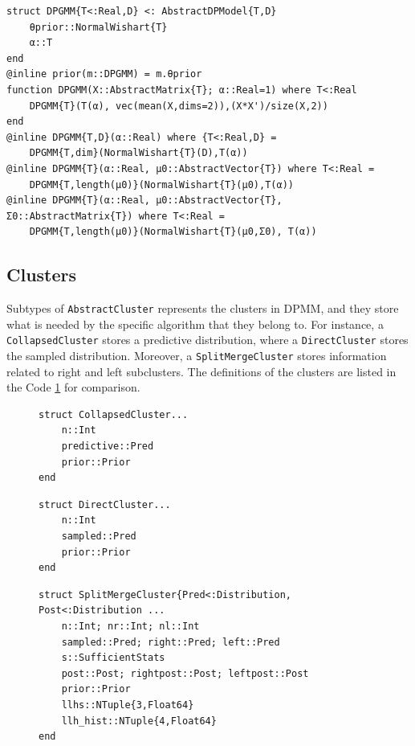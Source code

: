 \documentclass[12pt, a4paper]{article}
\newenvironment{code}{\captionsetup{type=listing}}{}
\begin{document}
\begin{code}
\begin{verbatim}
struct DPGMM{T<:Real,D} <: AbstractDPModel{T,D}
    θprior::NormalWishart{T}
    α::T
end
@inline prior(m::DPGMM) = m.θprior
function DPGMM(X::AbstractMatrix{T}; α::Real=1) where T<:Real
    DPGMM{T}(T(α), vec(mean(X,dims=2)),(X*X')/size(X,2))
end
@inline DPGMM{T,D}(α::Real) where {T<:Real,D} =
    DPGMM{T,dim}(NormalWishart{T}(D),T(α))
@inline DPGMM{T}(α::Real, μ0::AbstractVector{T}) where T<:Real =
    DPGMM{T,length(μ0)}(NormalWishart{T}(μ0),T(α))
@inline DPGMM{T}(α::Real, μ0::AbstractVector{T}, Σ0::AbstractMatrix{T}) where T<:Real =
    DPGMM{T,length(μ0)}(NormalWishart{T}(μ0,Σ0), T(α))
\end{verbatim}
\label{code:modelsdpgmm}
\end{code}



\subsection{Clusters}
Subtypes of \texttt{AbstractCluster} represents the clusters in DPMM, and they store what is needed by the specific algorithm that they belong to. For instance, a \texttt{CollapsedCluster} stores a predictive distribution, where a \texttt{DirectCluster} stores the sampled distribution. Moreover, a \texttt{SplitMergeCluster} stores information related to right and left subclusters. The definitions of the clusters are listed in the Code \ref{lst:representation_examples} for comparison.

\begin{figure}[h]
\begin{minipage}[t]{.4\textwidth}
\centering
\begin{verbatim}
struct CollapsedCluster...
    n::Int
    predictive::Pred
    prior::Prior
end
\end{verbatim}
\end{minipage}\hspace{1.45cm}
\begin{minipage}[t]{.4\textwidth}
\centering
\begin{verbatim}
struct DirectCluster...
    n::Int
    sampled::Pred
    prior::Prior
end
\end{verbatim}
\end{minipage}
\centering
\begin{minipage}[t]{.9\textwidth}
\centering
\begin{verbatim}
struct SplitMergeCluster{Pred<:Distribution, Post<:Distribution ...
    n::Int; nr::Int; nl::Int
    sampled::Pred; right::Pred; left::Pred
    s::SufficientStats
    post::Post; rightpost::Post; leftpost::Post
    prior::Prior
    llhs::NTuple{3,Float64}
    llh_hist::NTuple{4,Float64}
end
\end{verbatim}
\end{minipage}
\label{lst:representation_examples}
\end{figure}
\end{document}
